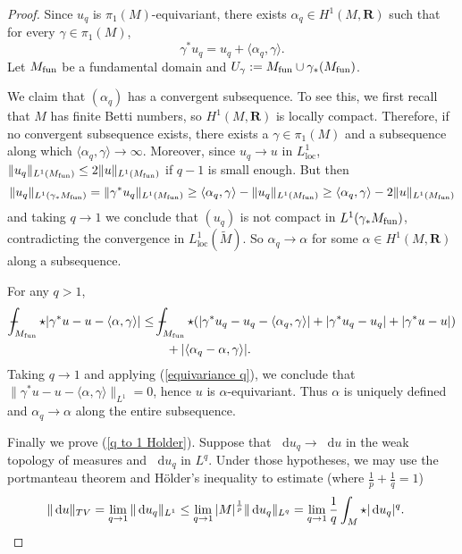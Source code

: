 \documentclass[reqno,11pt]{amsart}
\newcommand{\RR}{\mathbf{R}}
\newcommand*\dif{\mathop{}\!\mathrm{d}}
\newcommand{\loc}{\mathrm{loc}}
\theoremstyle{definition}
\numberwithin{equation}{section}
\def\Xint#1{\mathchoice
{\XXint\displaystyle\textstyle{#1}}%
{\XXint\textstyle\scriptstyle{#1}}%
{\XXint\scriptstyle\scriptscriptstyle{#1}}%
{\XXint\scriptscriptstyle\scriptscriptstyle{#1}}%
\!\int}
\def\XXint#1#2#3{{\setbox0=\hbox{$#1{#2#3}{\int}$ }
\vcenter{\hbox{$#2#3$ }}\kern-.6\wd0}}
\def\dashint{\Xint-}
\begin{document}
\begin{proof}
Since $u_q$ is $\pi_1(M)$-equivariant, there exists $\alpha_q \in H^1(M, \RR)$ such that for every $\gamma \in \pi_1(M)$,
\begin{equation}\label{equivariance q}
	\gamma^* u_q = u_q + \langle \alpha_q, \gamma\rangle.
\end{equation}
Let $M_{\rm fun}$ be a fundamental domain and $U_\gamma := M_{\rm fun} \cup \gamma_* (M_{\rm fun})$.

We claim that $(\alpha_q)$ has a convergent subsequence.
To see this, we first recall that $M$ has finite Betti numbers, so $H^1(M, \RR)$ is locally compact.
Therefore, if no convergent subsequence exists, there exists a $\gamma \in \pi_1(M)$ and a subsequence along which $\langle \alpha_q, \gamma\rangle \to \infty$.
Moreover, since $u_q \to u$ in $L^1_\loc$, $\|u_q\|_{L^1(M_{\rm fun})} \leq 2\|u\|_{L^1(M_{\rm fun})}$ if $q - 1$ is small enough.
But then 
$$\|u_q\|_{L^1(\gamma_* M_{\rm fun})} = \|\gamma^* u_q\|_{L^1(M_{\rm fun})} \geq \langle \alpha_q, \gamma\rangle - \|u_q\|_{L^1(M_{\rm fun})} \geq \langle \alpha_q, \gamma\rangle - 2\|u\|_{L^1(M_{\rm fun})}$$
and taking $q \to 1$ we conclude that $(u_q)$ is not compact in $L^1(\gamma_* M_{\rm fun})$, contradicting the convergence in $L^1_\loc(\tilde M)$.
So $\alpha_q \to \alpha$ for some $\alpha \in H^1(M, \RR)$ along a subsequence.

For any $q > 1$,
\begin{align*}
\dashint_{M_{\rm fun}} \star |\gamma^* u - u - \langle \alpha, \gamma\rangle| 
&\leq \dashint_{M_{\rm fun}} \star (|\gamma^* u_q - u_q - \langle \alpha_q, \gamma\rangle| + |\gamma^* u_q - u_q| + |\gamma^* u - u|) \\
&\qquad + |\langle \alpha_q - \alpha, \gamma\rangle|.
\end{align*}
Taking $q \to 1$ and applying (\ref{equivariance q}), we conclude that $\|\gamma^* u - u - \langle \alpha, \gamma\rangle\|_{L^1} = 0$, hence $u$ is $\alpha$-equivariant.
Thus $\alpha$ is uniquely defined and $\alpha_q \to \alpha$ along the entire subsequence.

Finally we prove (\ref{q to 1 Holder}).
Suppose that $\dif u_q \to \dif u$ in the weak topology of measures and $\dif u_q$ in $L^q$.
Under those hypotheses, we may use the portmanteau theorem and H\"older's inequality to estimate (where $\frac{1}{p} + \frac{1}{q} = 1$)
\begin{align*}
\|\dif u\|_{TV} &= \lim_{q \to 1} \|\dif u_q\|_{L^1} \leq \lim_{q \to 1} |M|^{\frac{1}{p}} \|\dif u_q\|_{L^q} = \lim_{q \to 1} \frac{1}{q} \int_M \star |\dif u_q|^q. \qedhere
\end{align*}
\end{proof}
\end{document}
